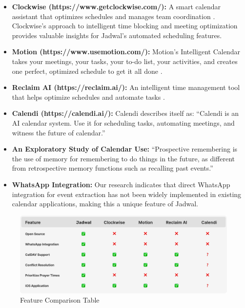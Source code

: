 \documentclass[12pt,a4paper]{report}
\begin{document}
\begin{itemize}
    \item \textbf{Clockwise (https://www.getclockwise.com/):} A smart calendar assistant that optimizes schedules and manages team coordination \cite{clockwise}. Clockwise's approach to intelligent time blocking and meeting optimization provides valuable insights for Jadwal's automated scheduling features.
    \item \textbf{Motion (https://www.usemotion.com/):} Motion's Intelligent Calendar takes your meetings, your tasks, your to-do list, your activities, and creates one perfect, optimized schedule to get it all done \cite{motion}.
    \item \textbf{Reclaim AI (https://reclaim.ai/):} An intelligent time management tool that helps optimize schedules and automate tasks \cite{reclaim}.
    \item \textbf{Calendi (https://calendi.ai/):} Calendi describes itself as: ``Calendi is an AI calendar system. Use it for scheduling tasks, automating meetings, and witness the future of calendar.'' \cite{calendi}
    \item \textbf{An Exploratory Study of Calendar Use:} ``Prospective remembering is the use of memory for remembering to do things in the future, as different from retrospective memory functions such as recalling past events.'' \cite{tungare2008exploratorystudycalendaruse}
    \item \textbf{WhatsApp Integration:} Our research indicates that direct WhatsApp integration for event extraction has not been widely implemented in existing calendar applications, making this a unique feature of Jadwal.
\end{itemize}

\begin{figure}[!h]
    \centering
    \includegraphics[width=\textwidth]{images/features-table.png}
    \caption{Feature Comparison Table}
    \label{fig:features-table}
\end{figure}
\end{document}
